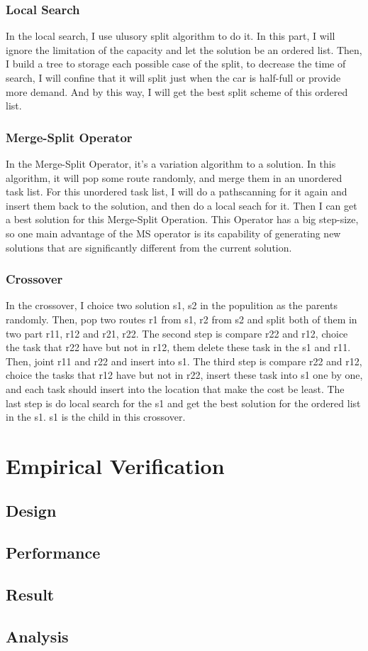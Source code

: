\documentclass[conference,compsoc]{IEEEtran}
\begin{document}
    \subsubsection{Local Search}
      In the local search, I use ulusory split algorithm to do it. In this part, I will ignore the limitation of the capacity and let the solution be an ordered list.
      Then, I build a tree to storage each possible case of the split, to decrease the time of search, I will confine that it will split just when the car is half-full or provide more demand.
      And by this way, I will get the best split scheme of this ordered list.
    \subsubsection{Merge-Split Operator}
      In the Merge-Split Operator, it's a variation algorithm to a solution. In this algorithm, it will pop some route randomly, and merge them in an unordered task list.
      For this unordered task list, I will do a pathscanning for it again and insert them back to the solution, and then do a local seach for it. Then I can get a best solution for this Merge-Split Operation.
      This Operator has a big step-size, so one main advantage of the MS operator is its capability of generating new solutions that are significantly different from the current solution.  
    \subsubsection{Crossover}
    In the crossover, I choice two solution s1, s2 in the populition as the parents randomly. Then, pop two routes r1 from s1, r2 from s2 and split both of them in two part r11, r12 and r21, r22.
    The second step is compare r22 and r12, choice the task that r22 have but not in r12, them delete these task in the s1 and r11. Then, joint r11 and r22 and insert into s1.
    The third step is compare r22 and r12, choice the tasks that r12 have but not in r22, insert these task into s1 one by one, and each task should insert into the location that make the cost be least.
    The last step is do local search for the s1 and get the best solution for the ordered list in the s1. s1 is the child in this crossover.
\section{Empirical Verification}
  \subsection{Design}

  \subsection{Performance}

  \subsection{Result}

  \subsection{Analysis}



\cite{rivest1987game}
\cite{knuth1975analysis}
\end{document}
